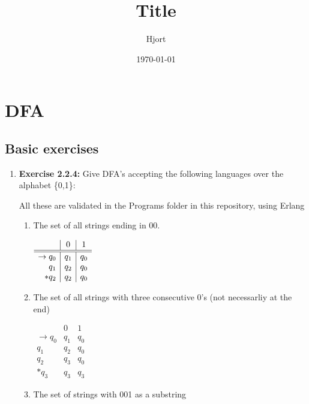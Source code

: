 \documentclass{article}
\title{Title}
\date{\today}
\author{Hjort}
\begin{document}
\maketitle

\section*{DFA}
\subsection*{Basic exercises}

\begin{enumerate}
    \item \textbf{Exercise 2.2.4:} Give DFA's accepting the following languages over the alphabet \{0,1\}:

        All these are validated in the Programs folder in this repository, using Erlang
        
        \begin{enumerate}
            \item The set of all strings ending in $00$.

                $
                \begin{array}{r | c | c}
                        & 0 & 1 \\ \hline \hline
                    \to q_0 & q_1 & q_0 \\
                        q_1 & q_2 & q_0\\
                        *q_2 & q_2 & q_0
                \end{array}
                $

            \item The set of all strings with three consecutive 0's (not necessarliy at the end)

                $ \begin{array}{r|c|c}
                            & 0 & 1 \\ \hline \hline
                    \to q_0 & q_1 & q_0 \\
                    q_1 & q_2 & q_0 \\
                    q_2 & q_3 & q_0 \\
                    *q_3 & q_3 & q_3
                \end{array}
                $

            \item The set of strings with 001 as a substring


\end{enumerate}
\end{enumerate}
\end{document}
